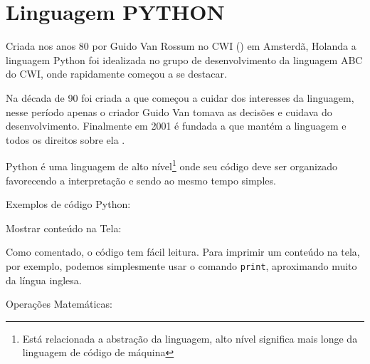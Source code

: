        \section{Linguagem PYTHON}
            \label{lim_python}
            
            Criada nos anos 80 por Guido Van Rossum no CWI () em Amsterdã, Holanda a linguagem Python foi idealizada no grupo de desenvolvimento da linguagem ABC do CWI, onde rapidamente começou a se destacar.
            
            Na década de 90 foi criada a  que começou a cuidar dos interesses da linguagem, nesse período apenas o criador Guido Van tomava as decisões e cuidava do desenvolvimento. Finalmente em 2001 é fundada a  que mantém a linguagem e todos os direitos sobre ela \cite{python36}.  
            
            Python é uma linguagem de alto nível\footnote{Está relacionada a abstração da linguagem, alto nível significa mais longe da linguagem de código de máquina} onde seu código deve ser organizado favorecendo a interpretação e sendo ao mesmo tempo simples.
            
            Exemplos de código Python:

            Mostrar conteúdo na Tela:
            
            Como comentado, o código tem fácil leitura. Para imprimir um conteúdo na tela, por exemplo, 
            podemos simplesmente usar o comando \verb|print|, aproximando muito da língua inglesa.  
            \begin{quote}
                                                       

            \end{quote}
            
            Operações Matemáticas:
            
